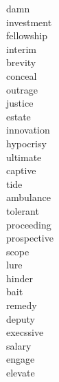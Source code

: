 \documentclass[a4paper, 10pt]{ctexart}
\begin{document}
\begin{multicols*}{2}
\begin{description}
\item[damn]

\item[investment]

\item[fellowship]

\item[interim]

\item[brevity]

\item[conceal]

\item[outrage]

\item[justice]

\item[estate]

\item[innovation]

\item[hypocrisy]

\item[ultimate]

\item[captive]

\item[tide]

\item[ambulance]

\item[tolerant]

\item[proceeding]

\item[prospective]

\item[scope]

\item[lure]

\item[hinder]

\item[bait]

\item[remedy]

\item[deputy]

\item[execssive]

\item[salary]

\item[engage]

\item[elevate]


\end{description}
\end{multicols*}
\end{document}
